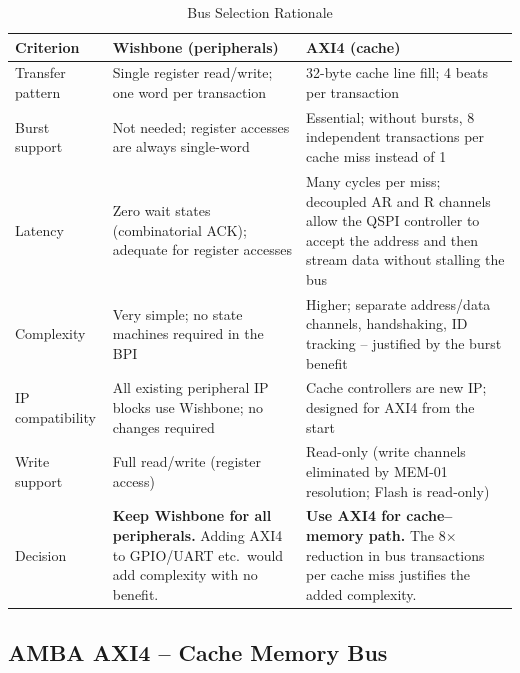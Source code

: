 \begin{table}[H]
\caption{Bus Selection Rationale}
\label{tab:asBusRationale}
\centering
\begin{tabularx}{\textwidth}{|l |X |X|}
  \hline
  Criterion & Wishbone (peripherals) & AXI4 (cache) \\
  \hline
  \hline
  Transfer pattern &
    Single register read/write; one word per transaction &
    32-byte cache line fill; 4 beats per transaction \\
  \hline
  Burst support &
    Not needed; register accesses are always single-word &
    Essential; without bursts, 8 independent transactions per
    cache miss instead of 1 \\
  \hline
  Latency &
    Zero wait states (combinatorial ACK); adequate for
    register accesses &
    Many cycles per miss; decoupled AR and R channels
    allow the QSPI controller to accept the address and
    then stream data without stalling the bus \\
  \hline
  Complexity &
    Very simple; no state machines required in the BPI &
    Higher; separate address/data channels, handshaking,
    ID tracking -- justified by the burst benefit \\
  \hline
  IP compatibility &
    All existing peripheral IP blocks use Wishbone;
    no changes required &
    Cache controllers are new IP; designed for AXI4 from
    the start \\
  \hline
  Write support &
    Full read/write (register access) &
    Read-only (write channels eliminated by MEM-01
    resolution; Flash is read-only) \\
  \hline
  Decision &
    \textbf{Keep Wishbone for all peripherals.}
    Adding AXI4 to GPIO/UART etc.\ would add complexity
    with no benefit. &
    \textbf{Use AXI4 for cache--memory path.}
    The 8$\times$ reduction in bus transactions per cache
    miss justifies the added complexity. \\
  \hline
\end{tabularx}
\end{table}



\subsection{AMBA AXI4 -- Cache Memory Bus}
\label{subsec:asAxi4Bus}

